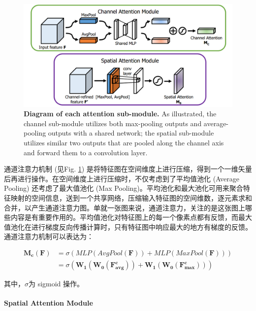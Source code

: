 \documentclass[a4paper, 10pt]{article}
\begin{document}
		\begin{figure}[htbp]
			\centering 
			\includegraphics[width=0.7\columnwidth]{picture/LLIE/CBAM/Attention Module}
			\caption{
				\label{fig: Attention Module} 
				\textbf{Diagram of each attention sub-module.} As illustrated, the channel sub-module utilizes both max-pooling outputs and average-pooling outputs with a shared network; the spatial sub-module utilizes similar two outputs that are pooled along the channel axis and forward them to a convolution layer.
			}
		\end{figure}
		
		通道注意力机制 (见Fig. \ref{fig: Attention Module}) 是将特征图在空间维度上进行压缩，得到一个一维矢量后再进行操作。在空间维度上进行压缩时，不仅考虑到了平均值池化 (Average Pooling) 还考虑了最大值池化 (Max Pooling)。平均池化和最大池化可用来聚合特征映射的空间信息，送到一个共享网络，压缩输入特征图的空间维数，逐元素求和合并，以产生通道注意力图。单就一张图来说，通道注意力，关注的是这张图上哪些内容是有重要作用的。平均值池化对特征图上的每一个像素点都有反馈，而最大值池化在进行梯度反向传播计算时，只有特征图中响应最大的地方有梯度的反馈。通道注意力机制可以表达为：
		
		\begin{equation}
			\begin{aligned}
				\mathbf{M_c}(\mathbf{F}) &= \sigma \left( MLP(AvgPool(\mathbf{F})) + MLP(MaxPool(\mathbf{F})) \right) \\
				&= \sigma \left( \mathbf{W_1}(\mathbf{W_0}(\mathbf{F_{avg}^c})) + \mathbf{W_1}(\mathbf{W_0}(\mathbf{F_{max}^c})) \right)	
			\end{aligned}
			\label{eq: Channel Attention Module}
		\end{equation}
		
		其中，$\sigma$为 sigmoid 操作。
		
		\paragraph{Spatial Attention Module}
		
\end{document}
